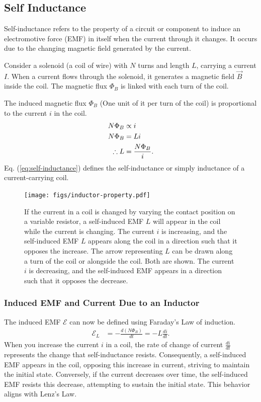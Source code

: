 \documentclass[12pt,b4paper]{article}
\begin{document}
\subsection{Self Inductance}
Self-inductance refers to the property of a circuit or component to induce an electromotive force (EMF) in itself when the current through it changes. It occurs due to the changing magnetic field generated by the current.

Consider a solenoid (a coil of wire) with $N$ turns and length $L$, carrying a current $I$. When a current flows through the solenoid, it generates a magnetic field $\vec{B}$ inside the coil. The magnetic flux $\Phi_B$ is linked with each turn of the coil.

The induced magnetic flux $\Phi_B$ (One unit of it per turn of the coil) is proportional to the current $i$ in the coil.
\begin{align}
    N\Phi_B&\propto i\notag\\
    N\Phi_B&=Li\notag\\
    \therefore L&=\frac{N\Phi_B}{i}.\label{eq:self-inductance}
\end{align}
Eq. (\ref{eq:self-inductance}) defines the self-inductance or simply inductance of a current-carrying coil.
\begin{figure}[H]
    \centering
    \texttt{[image: figs/inductor-property.pdf]}
    \caption{If the current in a coil is changed by varying the contact position on a variable resistor, a self-induced EMF $L$ will appear in the coil while the current is changing. The current $i$ is increasing, and the self-induced EMF $L$ appears along the coil in a direction such that it opposes the increase. The arrow representing $L$ can be drawn along a turn of the coil or alongside the coil. Both are shown. The current $i$ is decreasing, and the self-induced EMF appears in a direction such that it opposes the decrease.}
    \label{fig:self-inductance}
\end{figure}
\subsubsection{Induced EMF and Current Due to an Inductor}

The induced EMF $\mathcal{E}$ can now be defined using Faraday's Law of induction.
\begin{align}
    \mathcal{E}_L&=-\frac{d(N\Phi_B)}{dt}=-L\frac{di}{dt}.
\end{align}
When you increase the current $i$ in a coil, the rate of change of current $\displaystyle\frac{di}{dt}$ represents the change that self-inductance resists. Consequently, a self-induced EMF appears in the coil, opposing this increase in current, striving to maintain the initial state. Conversely, if the current decreases over time, the self-induced EMF resists this decrease, attempting to sustain the initial state. This behavior aligns with Lenz's Law.
\end{document}
